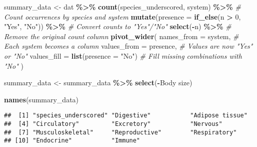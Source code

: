 \documentclass[
]{article}
\newenvironment{Shaded}{\begin{snugshade}}{\end{snugshade}}
\newcommand{\AttributeTok}[1]{\textcolor[rgb]{0.13,0.29,0.53}{#1}}
\newcommand{\CommentTok}[1]{\textcolor[rgb]{0.56,0.35,0.01}{\textit{#1}}}
\newcommand{\DecValTok}[1]{\textcolor[rgb]{0.00,0.00,0.81}{#1}}
\newcommand{\FunctionTok}[1]{\textcolor[rgb]{0.13,0.29,0.53}{\textbf{#1}}}
\newcommand{\NormalTok}[1]{#1}
\newcommand{\OtherTok}[1]{\textcolor[rgb]{0.56,0.35,0.01}{#1}}
\newcommand{\SpecialCharTok}[1]{\textcolor[rgb]{0.81,0.36,0.00}{\textbf{#1}}}
\newcommand{\StringTok}[1]{\textcolor[rgb]{0.31,0.60,0.02}{#1}}
\begin{document}
\begin{Shaded}
\begin{Highlighting}[]
\NormalTok{summary\_data }\OtherTok{\textless{}{-}}\NormalTok{ dat }\SpecialCharTok{\%\textgreater{}\%}
  \FunctionTok{count}\NormalTok{(species\_underscored, system) }\SpecialCharTok{\%\textgreater{}\%}  \CommentTok{\# Count occurrences by species and system}
  \FunctionTok{mutate}\NormalTok{(}\AttributeTok{presence =} \FunctionTok{if\_else}\NormalTok{(n }\SpecialCharTok{\textgreater{}} \DecValTok{0}\NormalTok{, }\StringTok{"Yes"}\NormalTok{, }\StringTok{"No"}\NormalTok{)) }\SpecialCharTok{\%\textgreater{}\%}  \CommentTok{\# Convert counts to "Yes"/"No"}
  \FunctionTok{select}\NormalTok{(}\SpecialCharTok{{-}}\NormalTok{n) }\SpecialCharTok{\%\textgreater{}\%} \CommentTok{\# Remove the original count column}
  \FunctionTok{pivot\_wider}\NormalTok{(}
    \AttributeTok{names\_from =}\NormalTok{ system,                   }\CommentTok{\# Each system becomes a column}
    \AttributeTok{values\_from =}\NormalTok{ presence,                }\CommentTok{\# Values are now "Yes" or "No"}
    \AttributeTok{values\_fill =} \FunctionTok{list}\NormalTok{(}\AttributeTok{presence =} \StringTok{"No"}\NormalTok{)    }\CommentTok{\# Fill missing combinations with "No"}
\NormalTok{  )}

\NormalTok{summary\_data }\OtherTok{\textless{}{-}}\NormalTok{ summary\_data }\SpecialCharTok{\%\textgreater{}\%}
  \FunctionTok{select}\NormalTok{(}\SpecialCharTok{{-}}\StringTok{\textasciigrave{}}\AttributeTok{Body size}\StringTok{\textasciigrave{}}\NormalTok{)}

\FunctionTok{names}\NormalTok{(summary\_data)}
\end{Highlighting}
\end{Shaded}

\begin{verbatim}
##  [1] "species_underscored" "Digestive"           "Adipose tissue"     
##  [4] "Circulatory"         "Excretory"           "Nervous"            
##  [7] "Musculoskeletal"     "Reproductive"        "Respiratory"        
## [10] "Endocrine"           "Immune"
\end{verbatim}

\begin{Shaded}
\end{Shaded}
\end{document}
